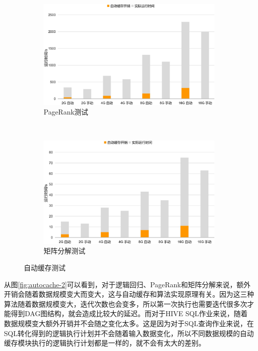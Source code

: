 \begin{figure}
\begin{subfigure}[b]{0.45\linewidth}
    \end{subfigure}
    \\%
    \begin{subfigure}[b]{0.45\linewidth}
      \includegraphics[width=\textwidth]{Img/pg1.jpg}
      \caption{PageRank测试}
      \label{fig:pagerank-auto-cache}
    \end{subfigure}%
    ~%
    \begin{subfigure}[b]{0.45\linewidth}
      \includegraphics[width=\textwidth]{Img/mx1.jpg}
      \caption{矩阵分解测试}
      \label{fig:matrix-auto-cache}
    \end{subfigure}
    \caption{自动缓存测试}
    \label{fig:auto-cache}
\end{figure}

从图\ref{fig:autocache-2}可以看到，对于逻辑回归、PageRank和矩阵分解来说，额外开销会随着数据规模变大而变大，这与自动缓存和算法实现原理有关。因为这三种算法随着数据规模变大，迭代次数也会变多，所以第一次执行也需要迭代很多次才能得到DAG图结构，就会造成比较大的延迟。而对于HIVE SQL作业来说，随着数据规模变大额外开销并不会随之变化太多。这是因为对于SQL查询作业来说，在SQL转化得到的逻辑执行计划并不会随着输入数据变化，所以不同数据规模的自动缓存模块执行的逻辑执行计划都是一样的，就不会有太大的差别。

